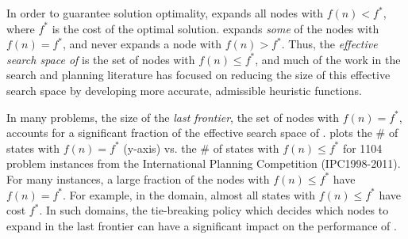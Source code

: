 In order to guarantee solution optimality, \astar expands all
nodes with $f(n) < f^*$, where $f^*$ is the cost of the optimal solution.
\astar expands \emph{some} of the nodes with $f(n) = f^*$, and never expands a node with $f(n) > f^*$.
Thus, the \emph{effective search space of \astar} is the set of nodes with 
$f(n) \leq f^*$, and
much of the work in the search and planning literature  has focused
on reducing the size of this effective search space by
developing more accurate, admissible heuristic functions.

In many problems, the size of the \emph{last frontier}, the set of nodes with $f(n)=f^*$, accounts for a significant fraction of the effective search space of \astar.
 plots the \# of states with $f(n) = f^*$ (y-axis)
vs. the \# of states with $f(n) \leq f^*$
for 1104 problem instances from the International Planning Competition (IPC1998-2011).
For many instances,  a large fraction of the nodes with $f(n) \leq f^*$ have $f(n)=f^*$.
For example, in the  domain, almost all states with $f(n) \leq f^*$ have cost $f^*$.
In such domains, the tie-breaking policy which decides which nodes to expand in the last frontier can have a significant impact on the performance of \astar.


